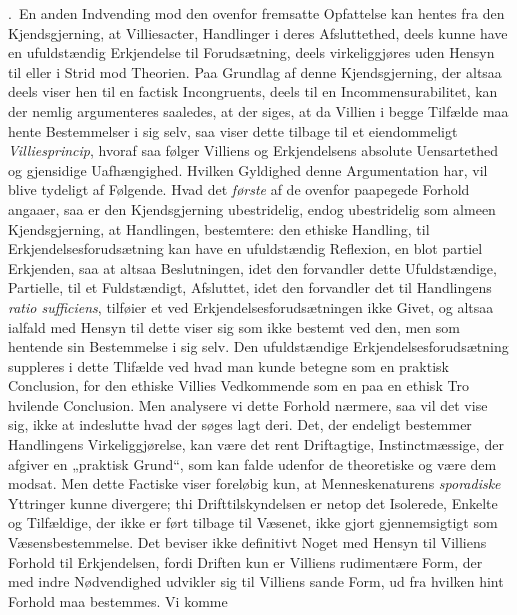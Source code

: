 \documentclass[12pt,a4paper]{book}
\newcommand{\opage}[1]{\marginnote{\footnotesize\textit{[#1]}}}
\begin{document}
\medskip

.~En anden Indvending mod den ovenfor fremsatte Opfattelse
kan hentes fra den Kjendsgjerning, at Villiesacter, Handlinger i deres
Afsluttethed, deels kunne have en ufuldstændig Erkjendelse til
Forudsætning, deels virkeliggjø\opage{143}res uden Hensyn til eller i Strid mod
Theorien. Paa Grundlag af denne Kjendsgjerning, der altsaa deels viser
hen til en factisk Incongruents, deels til en Incommensurabilitet, kan
der nemlig argumenteres saaledes, at der siges, at da Villien i begge
Tilfælde maa hente Bestemmelser i sig selv, saa viser dette tilbage
til et eiendommeligt \emph{Villiesprincip}, hvoraf saa følger Villiens og
Erkjendelsens absolute Uensartethed og gjensidige Uafhængighed. Hvilken
Gyldighed denne Argumentation har, vil blive tydeligt af Følgende. Hvad det \emph{første} af de ovenfor paapegede Forhold angaaer, saa er den
Kjendsgjerning ubestridelig, endog ubestridelig som almeen
Kjendsgjerning, at Handlingen, bestemtere: den ethiske Handling, til
Erkjendelsesforudsætning kan have en ufuldstændig Reflexion, en blot
partiel Erkjenden, saa at altsaa Beslutningen, idet den forvandler
dette Ufuldstændige, Partielle, til et Fuldstændigt, Afsluttet, idet
den forvandler det til Handlingens \textit{ratio sufficiens}, tilføier
et ved Erkjendelsesforudsætningen ikke Givet, og altsaa ialfald med
Hensyn til dette viser sig som ikke bestemt ved den, men som hentende
sin Bestemmelse i sig selv. Den ufuldstændige
Erkjendelsesforudsætning suppleres i dette Tlifælde ved hvad man kunde
betegne som en praktisk Conclusion, for den ethiske Villies Vedkommende
som en paa en ethisk Tro hvilende Conclusion. Men analysere vi dette
Forhold nærmere, saa vil det vise sig, ikke at indeslutte hvad der
søges lagt deri. Det, der endeligt bestemmer Handlingens
Virkeliggjørelse, kan være det rent Driftagtige, Instinctmæssige, der
afgiver en „praktisk Grund“, som kan falde udenfor de theoretiske og
være dem modsat. Men dette Factiske viser foreløbig kun, at
Menneskenaturens \emph{sporadiske} Yttringer kunne divergere; thi
Drifttilskyndelsen er netop det Isolerede, Enkelte og Tilfældige, der
ikke er ført tilbage til Væsenet, ikke gjort gjennemsigtigt som
Væsensbestemmelse. Det beviser ikke definitivt Noget med Hensyn til
Villiens Forhold til Erkjendelsen, fordi Driften kun er Villiens
rudimentære Form, der med indre Nødvendighed udvikler sig til Villiens
sande Form, ud fra \opage{144}hvilken hint Forhold maa bestemmes. Vi komme
\end{document}
